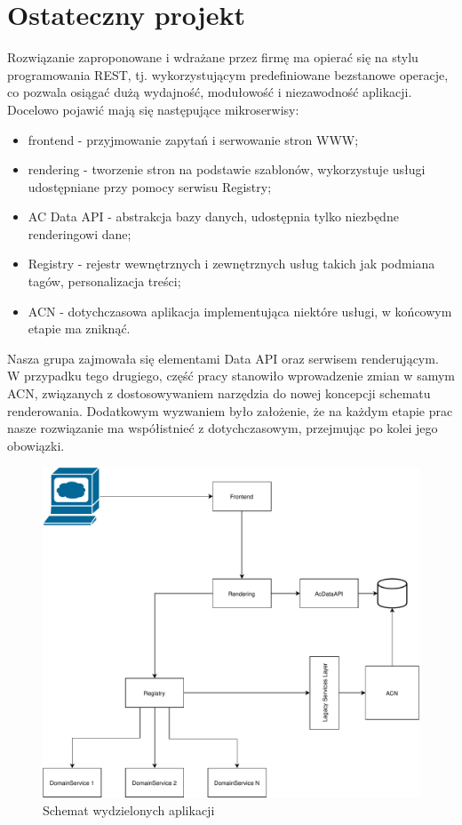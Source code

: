 \documentclass[licencjacka]{pracamgr}
\begin{document}
\section{Ostateczny projekt}
	
Rozwiązanie zaproponowane i wdrażane przez firmę ma opierać się na stylu programowania REST, tj. wykorzystującym predefiniowane bezstanowe operacje, co pozwala osiągać dużą wydajność, modułowość i niezawodność aplikacji. Docelowo pojawić mają się następujące mikroserwisy:
\begin{itemize}
\item frontend - przyjmowanie zapytań i serwowanie stron WWW;
\item rendering - tworzenie stron na podstawie szablonów, wykorzystuje usługi udostępniane przy pomocy serwisu Registry;
\item AC Data API - abstrakcja bazy danych, udostępnia tylko niezbędne renderingowi dane;
\item Registry - rejestr wewnętrznych i zewnętrznych usług takich jak podmiana tagów, personalizacja treści;
\item ACN - dotychczasowa aplikacja implementująca niektóre usługi, w końcowym etapie ma zniknąć.
\end{itemize}

Nasza grupa zajmowała się elementami Data API oraz serwisem renderującym. W przypadku tego drugiego, część pracy stanowiło wprowadzenie zmian w samym ACN, związanych z dostosowywaniem narzędzia do nowej koncepcji schematu renderowania. Dodatkowym wyzwaniem było założenie, że na każdym etapie prac nasze rozwiązanie ma współistnieć z dotychczasowym, przejmując po kolei jego obowiązki.

\vspace{30mm}

\begin{figure}[h]
	\includegraphics[scale=0.82]{images/architecture.pdf}
	\caption{Schemat wydzielonych aplikacji}
\end{figure}
\end{document}
